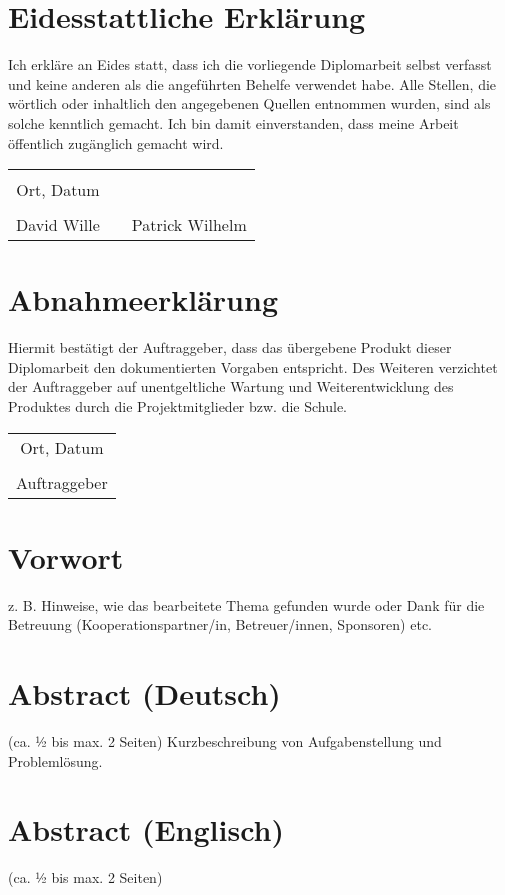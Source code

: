\chapter*{Eidesstattliche Erklärung}
Ich erkläre an Eides statt, dass ich die vorliegende Diplomarbeit selbst verfasst und keine anderen als die angeführten Behelfe verwendet habe. Alle Stellen, die wörtlich oder inhaltlich den angegebenen Quellen entnommen wurden, sind als solche kenntlich gemacht.
Ich bin damit einverstanden, dass meine Arbeit öffentlich zugänglich gemacht wird.

\vspace{1cm}
\begin{tabular}{c c c}
	& \hspace{4cm} & \\\cline{1-1}
	Ort, Datum & & \\
	\vspace{2cm}
	& & \\\cline{1-1}\cline{3-3}
	David Wille & & Patrick Wilhelm \\ 
	
\end{tabular}

\chapter*{Abnahmeerklärung}
Hiermit bestätigt der Auftraggeber, dass das übergebene Produkt dieser Diplomarbeit den dokumentierten Vorgaben entspricht. Des Weiteren verzichtet der Auftraggeber auf unentgeltliche Wartung und Weiterentwicklung des Produktes durch die Projektmitglieder bzw. die Schule.

\vspace{1cm}
\begin{tabular}{c}
	\\\cline{1-1}
	Ort, Datum\\
	\vspace{2cm}
	\\\cline{1-1}
	Auftraggeber
\end{tabular}	

\chapter*{Vorwort}
z. B. Hinweise, wie das bearbeitete Thema gefunden wurde oder Dank für die Betreuung (Kooperationspartner/in, Betreuer/innen, Sponsoren) etc.


\chapter*{Abstract (Deutsch)}
(ca. ½ bis max. 2 Seiten)
Kurzbeschreibung von Aufgabenstellung und Problemlösung.

\chapter*{Abstract (Englisch)}
(ca. ½ bis max. 2 Seiten)